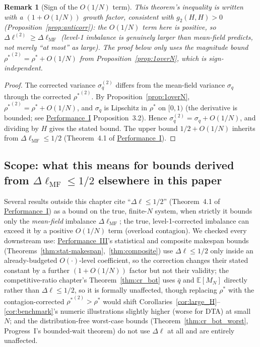 \documentclass[11pt,a4paper]{report}
\newtheorem{remark}{Remark}[section]
\newcommand{\rhostar}{\rho^{*}}
\newcommand{\gtwo}{g_2}
\begin{document}
\begin{remark}[Sign of the $O(1/N)$ term]
This theorem's inequality is written with a $(1+O(1/N))$ \emph{growth}
factor, consistent with $\gtwo(H,H)>0$ (Proposition~\ref{prop:anticorr}):
the $O(1/N)$ term here is \emph{positive}, so
$\Delta\ell^{(2)} \geq \Delta\ell_{\mathrm{MF}}$ (level-1 imbalance is
genuinely larger than mean-field predicts, not merely ``at most'' as
large). The proof below only uses the \emph{magnitude} bound
${\rhostar}^{(2)} = \rhostar + O(1/N)$ from Proposition~\ref{prop:1overN},
which is sign-independent.
\end{remark}

\begin{proof}
The corrected variance $\sigma_q^{(2)}$ differs from the mean-field
variance $\sigma_q$ through the corrected ${\rhostar}^{(2)}$.
By Proposition~\ref{prop:1overN}, ${\rhostar}^{(2)} = \rhostar + O(1/N)$,
and $\sigma_q$ is Lipschitz in $\rhostar$ on $[0,1)$ (the derivative
is bounded; see \hyperref[chap:load_balance]{Performance~I} Proposition~3.2).
Hence $\sigma_q^{(2)} = \sigma_q + O(1/N)$,
and dividing by $H$ gives the stated bound.
The upper bound $1/2 + O(1/N)$ inherits from $\Delta\ell_{\mathrm{MF}} \leq 1/2$
(Theorem~4.1 of \hyperref[chap:load_balance]{Performance~I}).
\end{proof}

\subsection{Scope: what this means for bounds derived from $\Delta\ell_{\mathrm{MF}} \leq 1/2$ elsewhere in this paper}
\label{sec:contagion-scope}

Several results outside this chapter cite ``$\Delta\ell \leq 1/2$''
(Theorem~4.1 of \hyperref[chap:load_balance]{Performance~I}) as a bound
on the true, finite-$N$ system, when strictly it bounds only the
\emph{mean-field} imbalance $\Delta\ell_{\mathrm{MF}}$; the true,
level-1-corrected imbalance can exceed it by a positive $O(1/N)$ term
(overload contagion). We checked every downstream use:
\hyperref[chap:makespan]{Performance~III}'s statistical and composite
makespan bounds (Theorems~\ref{thm:stat-makespan},~\ref{thm:composite})
use $\Delta\ell \leq 1/2$ only inside an already-budgeted
$O(\cdot)$-level coefficient, so the correction changes their stated
constant by a further $(1+O(1/N))$ factor but not their validity; the
competitive-ratio chapter's Theorem~\ref{thm:cr_bot} uses $\bar q$ and
$\mathbb{E}[M_N]$ directly rather than $\Delta\ell \leq 1/2$, so it is
formally unaffected, though replacing $\rhostar$ with the
contagion-corrected ${\rhostar}^{(2)}>\rhostar$ would shift
Corollaries~\ref{cor:large_H}--\ref{cor:benchmark}'s numeric
illustrations slightly higher (worse for DTA) at small $N$; and the
distribution-free worst-case bounds
(Theorem~\ref{thm:cr_bot_worst}, Progress~I's bounded-wait theorem) do
not use $\Delta\ell$ at all and are entirely unaffected.
\end{document}
